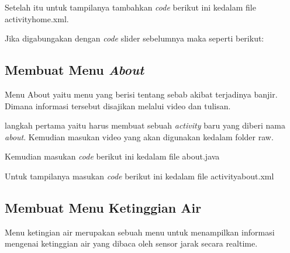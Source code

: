 \begin{enumerate}
\par Setelah itu untuk tampilanya tambahkan \textit{code} berikut ini kedalam file activityhome.xml.

\par Jika digabungakan dengan \textit{code} slider sebelumnya maka seperti berikut:

\end{enumerate}

\subsection{Membuat Menu \textit{About}}
\par Menu About yaitu menu yang berisi tentang sebab akibat terjadinya banjir. Dimana informasi tersebut disajikan melalui video dan tulisan.
\par langkah pertama yaitu harus membuat sebuah \textit{activity} baru yang diberi nama \textit{about}. Kemudian masukan video yang akan digunakan kedalam folder raw.

\par Kemudian masukan \textit{code} berikut ini kedalam file about.java

\par Untuk tampilanya masukan \textit{code} berikut ini kedalam file activityabout.xml


\subsection{Membuat Menu Ketinggian Air}
\par Menu ketingian air merupakan sebuah menu untuk menampilkan informasi mengenai ketinggian air yang dibaca oleh sensor jarak secara realtime. 

